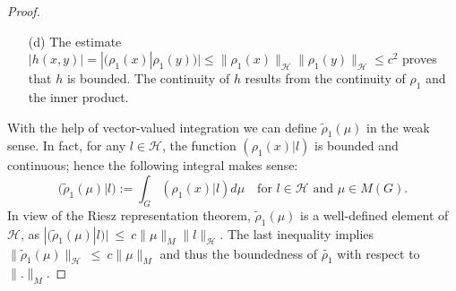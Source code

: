 \documentclass[10pt,a4paper]{amsart}
\begin{document}
\begin{proof}
\begin{enumerate}
 Let $(f_{\alpha })_{\alpha \in I}$  be tight, $L^{1}$-bounded
and  vaguely  convergent  with
limit $\delta _{0}$ (i.e., a generalized ``Dirac sequence'');
then the following completes the proof of part~c):
\begin{gather*}
h(x,y) = \int^{}_{G\times G} h(t) (\delta _{x}\otimes \delta _{y}) dt =
\lim_{\alpha } \langle h , T_{x}f_{\alpha }\otimes T_{y}f_{\alpha }
\rangle =\\
= \lim_{\alpha } \langle \sigma _{\rho} , T_{x}f_{\alpha }\otimes
T_{y}f_{\alpha } \rangle = (\tilde{\rho}(\delta _{x})| \tilde{\rho}(\bar{\delta }_{y})) = (\tilde{\rho}(\delta _{x})| \tilde{\rho}(\delta _{y})).
\end{gather*}

\item[(d)] The estimate
$ |h(x,y)| = |(\rho_{1}(x)| \rho _{1}(y))| \leq %
\| \rho_{1}(x)\|_{\mathcal{H}}\|\rho_{1}(y)\|_{\mathcal{H}} \le  c^{2}$
proves that $h$ is bounded. The continuity of $h$ results from the
continuity of $\rho _{1}$ and the inner product.
\end{enumerate}

With the help of vector-valued integration we can define
$ \tilde{\rho}_{1}(\mu)$ in the weak sense. In fact, for any
$ l \in \mathcal{H}$, the function $ (\rho _{1}(x)| l)$ is bounded and continuous;
hence the following integral makes sense:
\[
\bigl( \tilde{\rho}_{1}(\mu )| l\bigr) :=
\int^{}_{G} (\rho_{1}(x)| l) d\mu \quad \text{for} \,\, l \in \mathcal{H}\text{ and }\mu \in M(G).
\]
In view of the  Riesz  representation  theorem, $\tilde{\rho}_{1}(\mu )$  is  a  well-defined element of $\mathcal{H}$,
as $|(\tilde{\rho}_1(\mu)|l)| \: \leq \: c  \| \mu \|_M
\| l \|_{\mathcal{H}}$. The last inequality implies
$\| \tilde{\rho}_1(\mu) \|_\mathcal{H} \: \leq \: c \|
\mu \|_M$ and thus the boundedness of $\widetilde{\rho_1}$ with
respect to $\| . \|_M$.




\end{proof}
\end{document}

